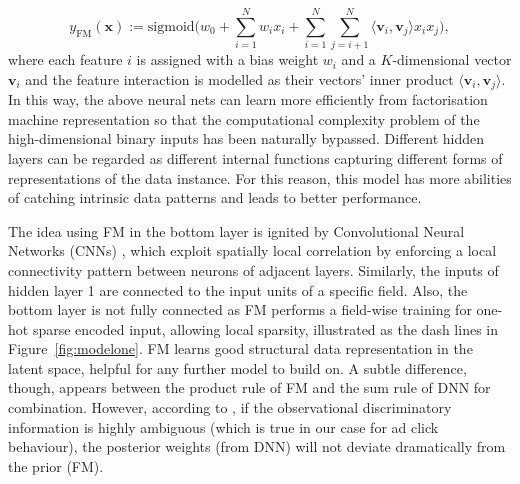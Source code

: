 \documentclass{llncs}
\newcommand{\bs}{\boldsymbol}
\newcommand{\sigmoid}{\text{sigmoid}}
\begin{document}
\begin{equation}
 y_{\text{FM}}(\bs{x}):=\sigmoid \Big( w_{0}+\sum_{i=1}^{N} w_{i} x_{i} + \sum_{i=1}^{N}\sum_{j=i+1}^{N}\langle\bs{v}_{i},\bs{v}_{j}\rangle x_{i} x_{j} \Big), \label{eq:xdef}
\end{equation}
where each feature $i$ is assigned with a bias weight $w_i$ and a $K$-dimensional vector $\bs{v}_i$ and the feature interaction is modelled as their vectors' inner product $\langle\bs{v}_{i},\bs{v}_{j}\rangle$. In this way, the above neural nets can learn more efficiently from factorisation machine representation so that the computational complexity problem of the high-dimensional binary inputs has been naturally bypassed. Different hidden layers can be regarded as different internal functions capturing different forms of representations of the data instance. For this reason, this model has more abilities of catching intrinsic data patterns and leads to better performance.

The idea using FM in the bottom layer is ignited by Convolutional Neural Networks (CNNs) \cite{fukushima1980neocognitron}, which exploit spatially local correlation by enforcing a local connectivity pattern between neurons of adjacent layers.  Similarly, the inputs of hidden layer 1 are connected to the input units of a specific field. Also, the bottom layer is not fully connected as FM performs a field-wise training for one-hot sparse encoded input, allowing local sparsity, illustrated as the dash lines in Figure~\ref{fig:modelone}.  FM learns good structural data representation in the latent space, helpful for any further model to build on.  A subtle difference, though, appears between the product rule of FM and the sum rule of DNN for combination. However, according to \cite{kittler1998combining}, if the observational discriminatory information is highly ambiguous (which is true in our case for ad click behaviour), the posterior weights (from DNN) will not deviate dramatically from the prior (FM).
\end{document}
